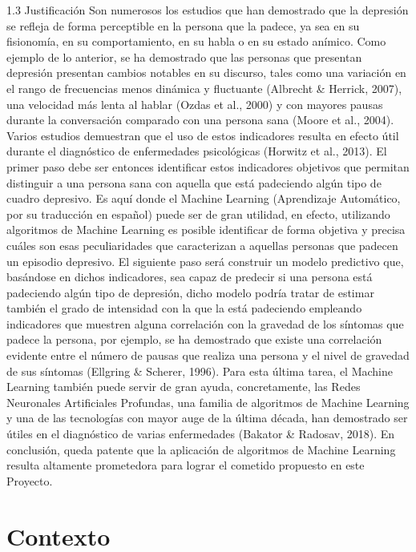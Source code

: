 1.3 Justificación
Son numerosos los estudios que han demostrado que la depresión se refleja de forma perceptible en la persona que la padece, ya sea en su fisionomía, en su comportamiento, en su habla o en su estado anímico. Como ejemplo de lo anterior, se ha demostrado que las personas que presentan depresión presentan cambios notables en su discurso, tales como una variación en el rango de frecuencias menos dinámica y fluctuante (Albrecht \& Herrick, 2007), una velocidad más lenta al hablar (Ozdas et al., 2000) y con mayores pausas durante la conversación comparado con una persona sana (Moore et al., 2004).
Varios estudios demuestran que el uso de estos indicadores resulta en efecto útil durante el diagnóstico de enfermedades psicológicas (Horwitz et al., 2013).
El primer paso debe ser entonces identificar estos indicadores objetivos que permitan distinguir a una persona sana con aquella que está padeciendo algún tipo de cuadro depresivo. Es aquí donde el Machine Learning (Aprendizaje Automático, por su traducción en español) puede ser de gran utilidad, en efecto, utilizando algoritmos de Machine Learning es posible identificar de forma objetiva y precisa cuáles son esas peculiaridades que caracterizan a aquellas personas que padecen un episodio depresivo. 
El siguiente paso será construir un modelo predictivo que, basándose en dichos indicadores, sea capaz de predecir si una persona está padeciendo algún tipo de depresión, dicho modelo podría tratar de estimar también el grado de intensidad con la que la está padeciendo empleando indicadores que muestren alguna correlación con la gravedad de los síntomas que padece la persona, por ejemplo, se ha demostrado que existe una correlación evidente entre el número de pausas que realiza una persona y el nivel de gravedad de sus síntomas (Ellgring \& Scherer, 1996).
Para esta última tarea, el Machine Learning también puede servir de gran ayuda, concretamente, las Redes Neuronales Artificiales Profundas, una familia de algoritmos de Machine Learning y una de las tecnologías con mayor auge de la última década, han demostrado ser útiles en el diagnóstico de varias enfermedades (Bakator \& Radosav, 2018).
En conclusión, queda patente que la aplicación de algoritmos de Machine Learning resulta altamente prometedora para lograr el cometido propuesto en este Proyecto.

\section{Contexto}


